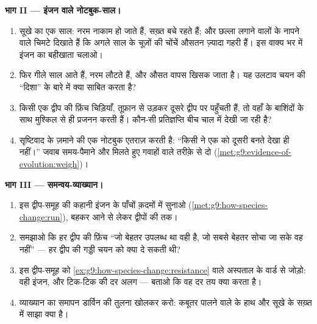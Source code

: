 \begin{problem}[{सप्ताहांत समस्या --- किसी ज्वालामुखी द्वीप-समूह पर दो
सदियाँ}]
\medskip\noindent\textbf{भाग II --- इंजन वाले नोटबुक-साल।}
\begin{enumerate}[resume]
  \item सूखे का एक साल: नरम  नाकाम हो जाते हैं, सख़्त  बचे रहते
        हैं; और छल्ला लगाने वालों के नापने वाले चिमटे दिखाते हैं कि
        अगले साल के चूज़ों की चोंचें औसतन ज़्यादा गहरी हैं। इस वाक्य
        भर में इंजन का बहीखाता चलाओ।
  \item फिर गीले साल आते हैं, नरम  लौटते हैं, और औसत वापस खिसक जाता
        है। यह उलटाव चयन की ``दिशा'' के बारे में क्या साबित करता है?
  \item किसी एक द्वीप की फ़िंच चिड़ियाँ, तूफ़ान से उड़कर दूसरे द्वीप पर
        पहुँचती हैं, तो वहाँ के बाशिंदों के साथ मुश्किल से ही प्रजनन
        करती हैं। कौन-सी प्रतिज्ञप्ति बीच चाल में देखी जा रही है?
  \item सृष्टिवाद के ज़माने की एक नोटबुक एतराज़ करती है: ``किसी ने एक
         को दूसरी बनते देखा ही नहीं।'' जवाब समय-पैमाने और
        मिलते हुए गवाहों वाले तरीक़े से दो
        (\cref{met:g9:evidence-of-evolution:weigh})।
\end{enumerate}

\medskip\noindent\textbf{भाग III --- समन्वय-व्याख्यान।}
\begin{enumerate}[resume]
  \item इस द्वीप-समूह की कहानी इंजन के पाँचों क़दमों में सुनाओ
        (\cref{met:g9:how-species-change:run}), बहकर आने से लेकर
        द्वीपों की  तक।
  \item समझाओ कि हर द्वीप की फ़िंच ``जो बेहतर उपलब्ध था वही है, जो सबसे
        बेहतर सोचा जा सके वह नहीं'' --- हर द्वीप की गड्डी चयन को क्या
        दे सकती थी?
  \item इस द्वीप-समूह को \cref{ex:g9:how-species-change:resistance}
        वाले अस्पताल के वार्ड से जोड़ो: वही इंजन, और टिक-टिक की दर
        अलग --- बताओ कि वह दर तय क्या करता है।
  \item व्याख्यान का समापन डार्विन की तुलना खोलकर करो: कबूतर पालने
        वाले के हाथ और सूखे के सख़्त  में साझा क्या है।
\end{enumerate}
\end{problem}
